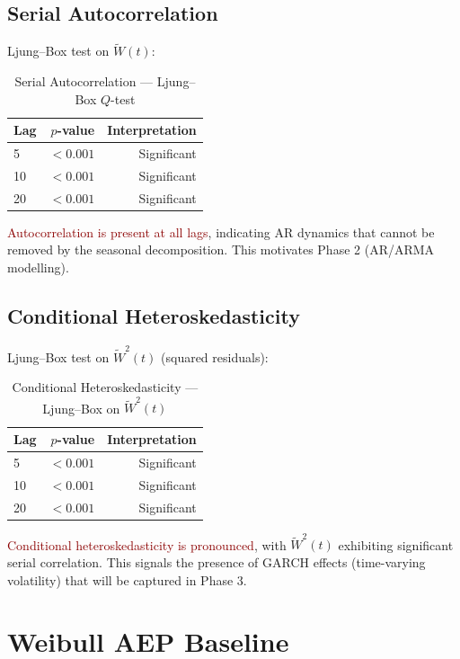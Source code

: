 \documentclass[11pt]{article}
\newcommand{\alert}[1]{\textcolor{darkred}{#1}}
\begin{document}
\subsection{Serial Autocorrelation}

Ljung--Box test on $\widetilde{W}(t)$:

\begin{table}[h]
\centering
\caption{Serial Autocorrelation --- Ljung--Box $Q$-test}
\label{tab:lbq_levels}
\begin{tabular}{lrr}
\toprule
\textbf{Lag} & \textbf{$p$-value} & \textbf{Interpretation} \\
\midrule
5 & $<0.001$ & Significant \\
10 & $<0.001$ & Significant \\
20 & $<0.001$ & Significant \\
\bottomrule
\end{tabular}
\end{table}

\alert{Autocorrelation is present at all lags}, indicating AR dynamics that cannot be removed by the seasonal decomposition. This motivates Phase 2 (AR/ARMA modelling).

\subsection{Conditional Heteroskedasticity}

Ljung--Box test on $\widetilde{W}^2(t)$ (squared residuals):

\begin{table}[h]
\centering
\caption{Conditional Heteroskedasticity --- Ljung--Box on $\widetilde{W}^2(t)$}
\label{tab:lbq_squared}
\begin{tabular}{lrr}
\toprule
\textbf{Lag} & \textbf{$p$-value} & \textbf{Interpretation} \\
\midrule
5 & $<0.001$ & Significant \\
10 & $<0.001$ & Significant \\
20 & $<0.001$ & Significant \\
\bottomrule
\end{tabular}
\end{table}

\alert{Conditional heteroskedasticity is pronounced}, with $\widetilde{W}^2(t)$ exhibiting significant serial correlation. This signals the presence of GARCH effects (time-varying volatility) that will be captured in Phase 3.

\section{Weibull AEP Baseline}
\end{document}
